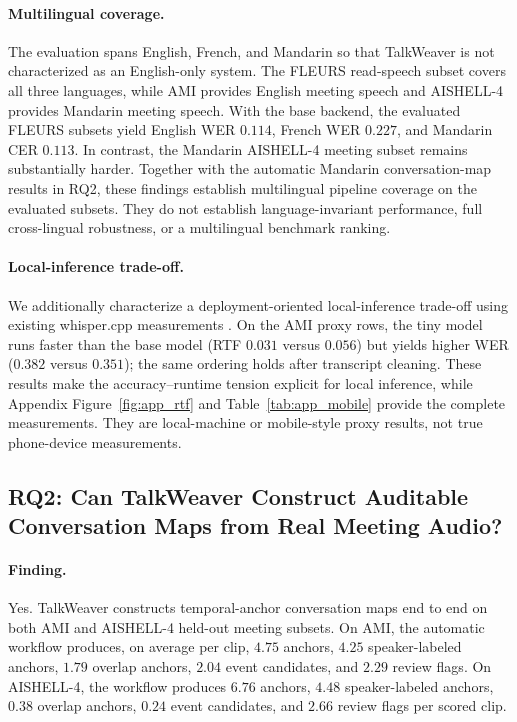\documentclass[10pt,twocolumn]{article}
\begin{document}
\paragraph{Multilingual coverage.}
The evaluation spans English, French, and Mandarin so that TalkWeaver is not characterized as an English-only system. The FLEURS read-speech subset covers all three languages, while AMI provides English meeting speech and AISHELL-4 provides Mandarin meeting speech. With the base backend, the evaluated FLEURS subsets yield English WER \(0.114\), French WER \(0.227\), and Mandarin CER \(0.113\). In contrast, the Mandarin AISHELL-4 meeting subset remains substantially harder. Together with the automatic Mandarin conversation-map results in RQ2, these findings establish multilingual pipeline coverage on the evaluated subsets. They do not establish language-invariant performance, full cross-lingual robustness, or a multilingual benchmark ranking.

\paragraph{Local-inference trade-off.}
We additionally characterize a deployment-oriented local-inference trade-off using existing whisper.cpp measurements \cite{ggerganov2023whispercpp}. On the AMI proxy rows, the tiny model runs faster than the base model (RTF \(0.031\) versus \(0.056\)) but yields higher WER (\(0.382\) versus \(0.351\)); the same ordering holds after transcript cleaning. These results make the accuracy--runtime tension explicit for local inference, while Appendix Figure~\ref{fig:app_rtf} and Table~\ref{tab:app_mobile} provide the complete measurements. They are local-machine or mobile-style proxy results, not true phone-device measurements.

\subsection{RQ2: Can TalkWeaver Construct Auditable Conversation Maps from Real Meeting Audio?}
\label{sec:rq2}

\paragraph{Finding.}
Yes. TalkWeaver constructs temporal-anchor conversation maps end to end on both AMI and AISHELL-4 held-out meeting subsets. On AMI, the automatic workflow produces, on average per clip, \(4.75\) anchors, \(4.25\) speaker-labeled anchors, \(1.79\) overlap anchors, \(2.04\) event candidates, and \(2.29\) review flags. On AISHELL-4, the workflow produces \(6.76\) anchors, \(4.48\) speaker-labeled anchors, \(0.38\) overlap anchors, \(0.24\) event candidates, and \(2.66\) review flags per scored clip.
\end{document}
